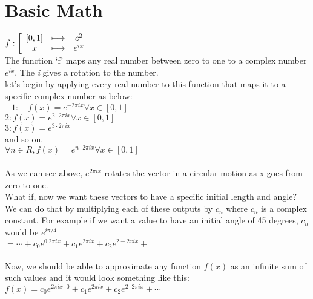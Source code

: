 \documentclass{article}
\begin{document}
\section*{Basic Math}
$f: \left[ \begin{array} { c c c } { [ 0,1 ] } & { \longmapsto } & { c ^ { 2 } } \\ { x } & { \longmapsto } & { e ^ { i x } } \end{array} \right.$\\
The function `f' maps any real number between zero to one to a complex number $e ^ {ix}$.
The \textit{i} gives a rotation to the number.
\\
let's begin by applying every real number to this function that maps it to a specific complex number as below:\\
$ -1: \quad f ( x ) = e ^ { - 2 \pi i x }   \forall x \in [ 0,1 ]$\\
$2: f ( x ) = e ^ { 2 \cdot 2 \pi i x }     \forall x \in [ 0,1 ]$\\
$3:  f ( x ) = e ^ { 3 \cdot 2 \pi i x }$\\
and so on.\\
$\forall n \in { R } , f ( x ) = e ^ { n \cdot 2 \pi i x } \forall x \in [ 0,1 ]$\\
\\
As we can see above, $e^{2 \pi i x}$ rotates the vector in a circular motion as x goes from zero to one.
\\
What if, now we want these vectors to have a specific initial length and angle? We can do that by multiplying 
each of these outputs by $c_{n}$ where $c_{n}$ is a complex constant. For example if we want a value to have an initial angle of 45 degrees, $c_{n}$ would be $e^{i \pi /4}$\\
$= \cdots + c _ { 0 } e ^ { 0.2 \pi i x } + c _ { 1 } e ^ { 2 \pi i x } + c _ { 2 } e ^ { 2 - 2 x i x } +$\\
\\
Now, we should be able to approximate any function $f ( x ) $ as an infinite sum of such values and it would look something like this:\\
$f ( x ) = c _ { 0 } e ^ { 2 \pi i x \cdot 0 } + c _ { 1 } e ^ { 2 \pi i x } + c _ { 2 } e ^ { 2 \cdot 2 \pi i x } + \cdots$\\
\end{document}
